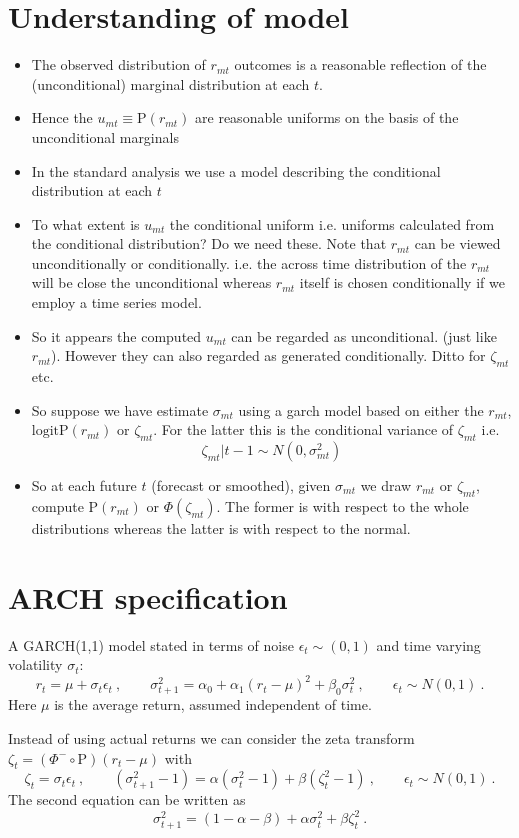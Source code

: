 \documentclass[authoryear]{elsarticle}
\newcommand{\logit}{\mathrm{logit}}
\newcommand{\eps}{\epsilon}
\newcommand{\bi}{\begin{itemize}}
\newcommand{\ei}{\end{itemize}}
\renewcommand{\i}{\item}
\newcommand{\cq}{\ , \qquad}
\renewcommand{\P}{\mathrm{P}}
\begin{document}
\section{Understanding of model}
\bi
\i  The observed distribution of $r_{mt}$ outcomes is a reasonable reflection of the (unconditional) marginal distribution at each $t$.
\i  Hence the $u_{mt}\equiv \P(r_{mt})$ are reasonable uniforms on the basis of the unconditional marginals
\i  In the standard analysis we use a model describing the conditional distribution at each $t$
\i  To what extent is $u_{mt}$ the conditional uniform i.e. uniforms calculated from the conditional distribution?  Do we need these.  Note that $r_{mt}$ can be viewed unconditionally or conditionally.   i.e. the across time distribution of the $r_{mt}$ will be close the unconditional whereas $r_{mt}$ itself is chosen conditionally if we employ a time series model.     
\i  So it appears the computed $u_{mt}$ can be regarded as unconditional.  (just like $r_{mt}$).    However they can also regarded as generated conditionally.  Ditto for $\zeta_{mt}$ etc.
\i  So suppose we have estimate $\sigma_{mt}$ using a garch model based on either the $r_{mt}$, $\logit \P(r_{mt})$ or $\zeta_{mt}$.   For the latter this is the conditional variance of $\zeta_{mt}$ i.e.
$$
\zeta_{mt}|t-1 \sim N(0,\sigma^2_{mt})
$$
\i So at each future $t$ (forecast or smoothed), given $\sigma_{mt}$  we draw $r_{mt}$ or $\zeta_{mt}$, compute $\P(r_{mt})$ or $\Phi(\zeta_{mt})$.  The former is with respect to the whole distributions whereas the latter is with respect to the normal.
\ei 

\section{ARCH specification}
   A GARCH(1,1) model stated in terms of noise $\eps_t\sim(0,1)$ and time varying volatility $\sigma_t$:
$$
r_t= \mu + \sigma_t\eps_t\cq \sigma^2_{t+1} = \alpha_0+\alpha_1(r_{t}-\mu)^2+ \beta_0 \sigma_t^2\cq \eps_t\sim N(0,1)\ .
$$
Here $\mu$ is the average return, assumed independent of time.

Instead of using  actual returns we can consider the zeta transform $\zeta_t=(\Phi^-\circ \P)(r_t-\mu)$
with 
\begin{equation}\label{garch}
\zeta_t=  \sigma_t\eps_t\cq (\sigma^2_{t+1}-1) = \alpha (\sigma^2_{t}-1) + \beta(\zeta_t^2-1)\cq \eps_t\sim N(0,1)\ .
\end{equation}
The second equation can be written as
$$
\sigma^2_{t+1} = (1-\alpha-\beta) +  \alpha \sigma^2_{t} + \beta \zeta_t^2\ .
$$
\end{document}
